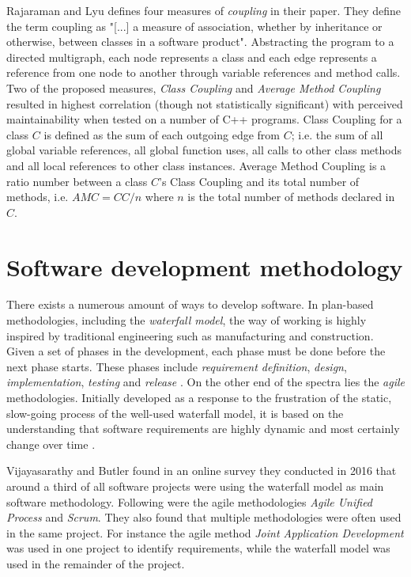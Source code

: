 Rajaraman and Lyu \cite{rajaraman1992reliability} defines four measures of
\textit{coupling} in their paper. They define the term coupling as "[...] a
measure of association, whether by inheritance or otherwise, between classes in
a software product". Abstracting the program to a directed multigraph, each
node represents a class and each edge represents a reference from one node to
another through variable references and method calls. Two of the proposed
measures, \textit{Class Coupling} and \textit{Average Method Coupling} resulted
in highest correlation (though not statistically significant) with perceived
maintainability when tested on a number of C++ programs. Class Coupling for a
class $C$ is defined as the sum of each outgoing edge from $C$; i.e. the sum of
all global variable references, all global function uses, all calls to other
class methods and all local references to other class instances. Average Method
Coupling is a ratio number between a class $C$'s Class Coupling and its total
number of methods, i.e. $AMC = CC / n$ where $n$ is the total number of methods
declared in $C$.

\section{Software development methodology}

There exists a numerous amount of ways to develop software. In plan-based
methodologies, including the \textit{waterfall model}, the way of working is
highly inspired by traditional engineering such as manufacturing and
construction. Given a set of phases in the development, each phase must be done
before the next phase starts. These phases include \textit{requirement
definition}, \textit{design}, \textit{implementation}, \textit{testing} and
\textit{release} \cite{crookshanks2014practical}. On the other end of the
spectra lies the \textit{agile} methodologies. Initially developed as a
response to the frustration of the static, slow-going process of the well-used
waterfall model, it is based on the understanding that software requirements
are highly dynamic and most certainly change over time
\cite{moniruzzaman2013comparative}.

Vijayasarathy and Butler \cite{vijayasarathy2016choice} found in an online
survey they conducted in 2016 that around a third of all software projects were
using the waterfall model as main software methodology. Following were the
agile methodologies \textit{Agile Unified Process} and \textit{Scrum}. They
also found that multiple methodologies were often used in the same project.
For instance the agile method \textit{Joint Application Development} was used
in one project to identify requirements, while the waterfall model was used in
the remainder of the project.

